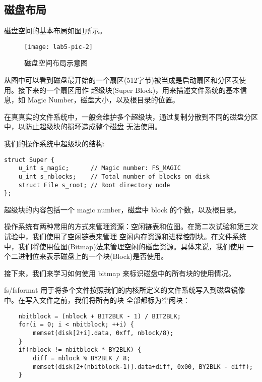 \subsection{磁盘布局}

磁盘空间的基本布局如图\ref{lab5-pic-2}所示。

\begin{figure}[htbp]
  \centering
  \texttt{[image: lab5-pic-2]}
  \caption{磁盘空间布局示意图}\label{lab5-pic-2}
\end{figure}

从图中可以看到磁盘最开始的一个扇区(512字节)被当成是启动扇区和分区表使用。接下来的一个扇区用作
超级块(Super Block)，用来描述文件系统的基本信息，如 Magic Number，磁盘大小，以及根目录的位置。

\begin{note}
在真真实的文件系统中，一般会维护多个超级块，通过复制分散到不同的磁盘分区中，以防止超级块的损坏造成整个磁盘
无法使用。
\end{note}

我们的操作系统中超级块的结构:

\begin{verbatim}
struct Super {
    u_int s_magic;      // Magic number: FS_MAGIC
    u_int s_nblocks;    // Total number of blocks on disk
    struct File s_root; // Root directory node
};
\end{verbatim}

超级块的内容包括一个 magic number，磁盘中 block 的个数，以及根目录。

操作系统有两种常用的方式来管理资源：空闲链表和位图。在第二次试验和第三次试验中，我们使用了空闲链表来管理
空闲内存资源和进程控制块。在文件系统中，我们将使用位图(Bitmap)法来管理空闲的磁盘资源。具体来说，我们使用
一个二进制位来表示磁盘上的一个块(Block)是否使用。

接下来，我们来学习如何使用 bitmap 来标识磁盘中的所有块的使用情况。

fs/fsformat 用于将多个文件按照我们的内核所定义的文件系统写入到磁盘镜像中。在写入文件之前，我们将所有的块
全部都标为空闲块：

\begin{verbatim}
    nbitblock = (nblock + BIT2BLK - 1) / BIT2BLK;
    for(i = 0; i < nbitblock; ++i) {
        memset(disk[2+i].data, 0xff, nblock/8);
    }
    if(nblock != nbitblock * BY2BLK) {
        diff = nblock % BY2BLK / 8;
        memset(disk[2+(nbitblock-1)].data+diff, 0x00, BY2BLK - diff);
    }
\end{verbatim}

